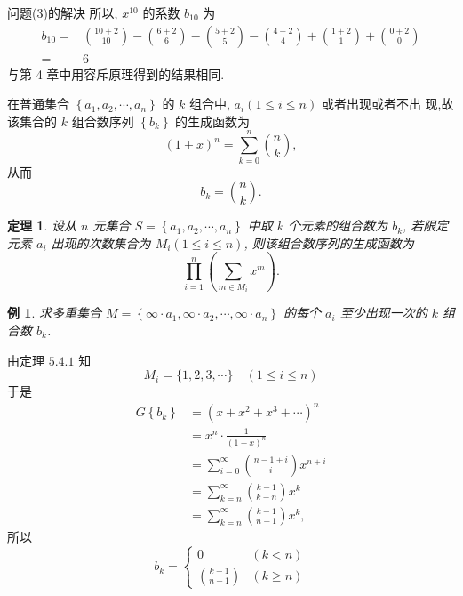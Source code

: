 \documentclass[punct]{ctexbeamer}
\newtheorem{thm}{定理}[section]
\newtheorem{ex}{例}[section]
\def\sol{\noindent {\bf 解\ }}
\begin{document}
\begin{frame}{问题(3)的解决}
	所以, $x^{10}$ 的系数 $b_{10}$ 为
	$$
	\begin{aligned}
	b_{10}=&\binom{10+2}{10}-\binom{6+2}{6}-\binom{5+2}{5}-\binom{4+2}{4}+\binom{1+2}{1}+\binom{0+2}{0}\\
	=& 6
	\end{aligned}
	$$
	与第 4 章中用容斥原理得到的结果相同.

	在普通集合 $\left\{a_{1}, a_{2}, \cdots, a_{n}\right\}$ 的 $k$ 组合中, $a_{i}(1 \leqslant i \leqslant n)$ 或者出现或者不出 现,故该集合的 $k$ 组合数序列 $\left\{b_{k}\right\}$ 的生成函数为
	$$
	(1+x)^{n}=\sum_{k=0}^{n}\binom{n}{k},
	$$
	从而
	$$
	b_{k}=\binom{n}{k}.
	$$
\end{frame}

\begin{frame}
	\begin{thm}
		设从 $n$ 元集合 $S=\left\{a_{1}, a_{2}, \cdots, a_{n}\right\}$ 中取 $k$ 个元素的组合数为 $b_{k}$, 若限定元素 $a_{i}$ 出现的次数集合为 $M_{i}(1 \leqslant i \leqslant n)$, 则该组合数序列的生成函数为
		$$
		\prod_{i=1}^{n}\left(\sum_{m \in M_{i}} x^{m}\right).
		$$
	\end{thm}
\pause
\begin{ex}
	求多重集合 $M=\left\{\infty \cdot a_{1}, \infty \cdot a_{2}, \cdots, \infty \cdot a_{n}\right\}$ 的每个 $a_{i}$ 至少出现一次的 $k$ 组合数 $b_{k}$.
\end{ex}
\end{frame}

\begin{frame}
	\sol 由定理 $5.4.1$ 知
	$$
	M_{i}=\{1,2,3, \cdots\} \quad(1 \leqslant i \leqslant n)
	$$
	于是
	$$
	\begin{aligned}
	G\left\{b_{k}\right\} &=\left(x+x^{2}+x^{3}+\cdots\right)^{n} \\
	&=x^{n} \cdot \frac{1}{(1-x)^{n}} \\
	&=\sum_{i=0}^{\infty}\binom{n-1+i}{i} x^{n+i} \\
	&=\sum_{k=n}^{\infty}\binom{k-1}{k-n} x^{k} \\
	&=\sum_{k=n}^{\infty}\binom{k-1}{n-1} x^{k},
	\end{aligned}
	$$
	所以
	$$
	b_{k}=\left\{\begin{array}{ll}
	0 & (k<n) \\
	\binom{k-1}{n-1} & (k \geqslant n)
	\end{array}\right.
	$$
\end{frame}
\end{document}

